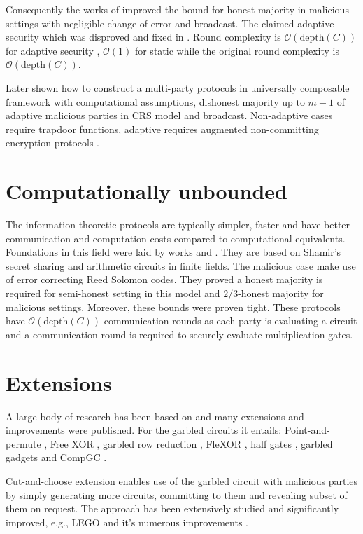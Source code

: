 \documentclass[
  digital, %
  twoside, %
  table,   %
  lof,     %
  lot,     %
]{fithesis3}
\newcommand{\bigO}[0]{\mathcal{O}}
\begin{document}
Consequently the works of \cite{RB89, B91} improved the bound for honest majority in malicious settings with negligible change of error and broadcast.
The \cite{RB89} claimed adaptive security which was disproved and fixed in \cite{CDDHR99}.
Round complexity is $\bigO(\text{depth}(C))$ for adaptive security \cite{GMW87, CDDHR99}, $\bigO(1)$ for static \cite{BMR90} while the original \cite{GMW87} round complexity is $\bigO(\text{depth}(C))$.

Later \cite{CLOS02} shown how to construct a multi-party protocols in universally composable framework with computational assumptions, dishonest majority up to $m-1$ of adaptive malicious parties in CRS model and broadcast. 
Non-adaptive cases require trapdoor functions, adaptive requires augmented non-committing encryption protocols \cite{CFGN96}.

\section{Computationally unbounded}%
The information-theoretic protocols are typically simpler, faster and have better communication and computation costs compared to computational equivalents. Foundations in this field were laid by works \cite{BGW88} and \cite{CCD88}. They are based on Shamir's secret sharing and arithmetic circuits in finite fields. The malicious case make use of error correcting Reed Solomon codes. They proved a honest majority is required for semi-honest setting in this model and $2/3$-honest majority for malicious settings. Moreover, these bounds were proven tight. These protocols have $\bigO(\text{depth}(C))$ communication rounds as each party is evaluating a circuit and a communication round is required to securely evaluate multiplication gates.

\section{Extensions}%
A large body of research has been based on \cite{Yao86, GMW87, BGW88, CCD88} and many extensions and improvements were published. 
For the garbled circuits it entails: Point-and-permute \cite{BMR90}, Free XOR \cite{KS08}, garbled row reduction \cite{NPS99, PSSW09}, FleXOR \cite{KMR14}, half gates \cite{ZRE14}, garbled gadgets \cite{BMR16} and CompGC \cite{cryptoeprint:2016:458}.

Cut-and-choose extension \cite{LP07,LP11,Lin16} enables use of the garbled circuit with malicious parties by simply generating more circuits, committing to them and revealing subset of them on request. The approach has been extensively studied and significantly improved, e.g., LEGO \cite{NO09} and it's numerous improvements \cite{cryptoeprint:2013:155, FJNT15, cryptoeprint:2016:1069, cryptoeprint:2017:226, KNBTR17, cryptoeprint:2018:578}.
\end{document}
